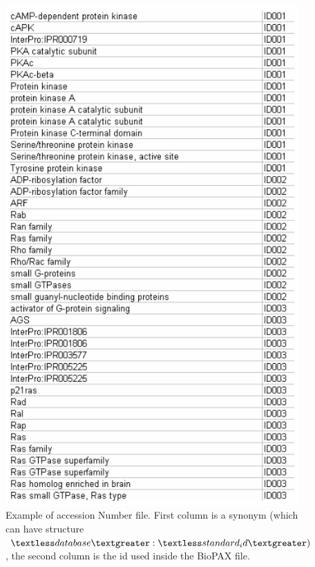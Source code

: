 \begin{figure}[h]
\centering
\includegraphics[width=14 cm]{graphics/Accession_Number_File}
\caption{Example of accession Number file. First column is a synonym (which can have structure $\textless database\textgreater :\textless standard_id\textgreater)$, the second column is the id used inside the BioPAX file.}
\label{Accession_Number_File}
\end{figure}

